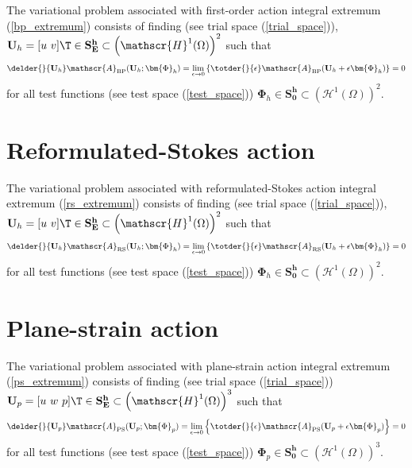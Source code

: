 The variational problem associated with first-order action integral extremum (\ref{bp_extremum}) consists of finding (see trial space (\ref{trial_space})), $\mathbf{U}_h = [u\ v]\T \in \mathbf{S_E^h} \subset \left( \mathscr{H}^1(\Omega) \right)^2$ such that
\begin{align}
  \label{first_order_var_form_2}
  \delder{}{\mathbf{U}_h} \mathscr{A}_{\text{BP}}(\mathbf{U}_h; \bm{\Phi}_h) = \lim_{\epsilon \rightarrow 0} \left\{ \totder{}{\epsilon} \mathscr{A}_{\text{BP}}(\mathbf{U}_h + \epsilon \bm{\Phi}_h) \right\} = 0
\end{align}
for all test functions (see test space (\ref{test_space})) $\bm{\Phi}_h \in \mathbf{S_0^h} \subset \left( \mathscr{H}^1(\Omega) \right)^2$.

\section{Reformulated-Stokes action}

The variational problem associated with reformulated-Stokes action integral extremum (\ref{rs_extremum}) consists of finding (see trial space (\ref{trial_space})), $\mathbf{U}_h = [u\ v]\T \in \mathbf{S_E^h} \subset \left( \mathscr{H}^1(\Omega) \right)^2$ such that
\begin{align}
  \label{reformulated_var_form_2}
  \delder{}{\mathbf{U}_h} \mathscr{A}_{\text{RS}} (\mathbf{U}_h; \bm{\Phi}_h) = \lim_{\epsilon \rightarrow 0} \left\{ \totder{}{\epsilon} \mathscr{A}_{\text{RS}}(\mathbf{U}_h + \epsilon \bm{\Phi}_h) \right\} = 0
\end{align}
for all test functions (see test space (\ref{test_space})) $\bm{\Phi}_h \in \mathbf{S_0^h} \subset \left( \mathscr{H}^1(\Omega) \right)^2$.

\section{Plane-strain action}

The variational problem associated with plane-strain action integral extremum (\ref{ps_extremum}) consists of finding (see trial space (\ref{trial_space})) $\mathbf{U}_p = [u\ w\ p]\T \in \mathbf{S_E^h} \subset \left( \mathscr{H}^1(\Omega) \right)^3$ such that
\begin{align}
  \label{plane_strain_var_form_2}
  \delder{}{\mathbf{U}_p} \mathscr{A}_{\text{PS}}(\mathbf{U}_p; \bm{\Phi}_p) = \lim_{\epsilon \rightarrow 0} \left\{ \totder{}{\epsilon} \mathscr{A}_{\text{PS}}(\mathbf{U}_p + \epsilon \bm{\Phi}_p) \right\} = 0
\end{align}
for all test functions (see test space (\ref{test_space})) $\bm{\Phi}_p \in \mathbf{S_0^h} \subset \left( \mathscr{H}^1(\Omega) \right)^3$.

